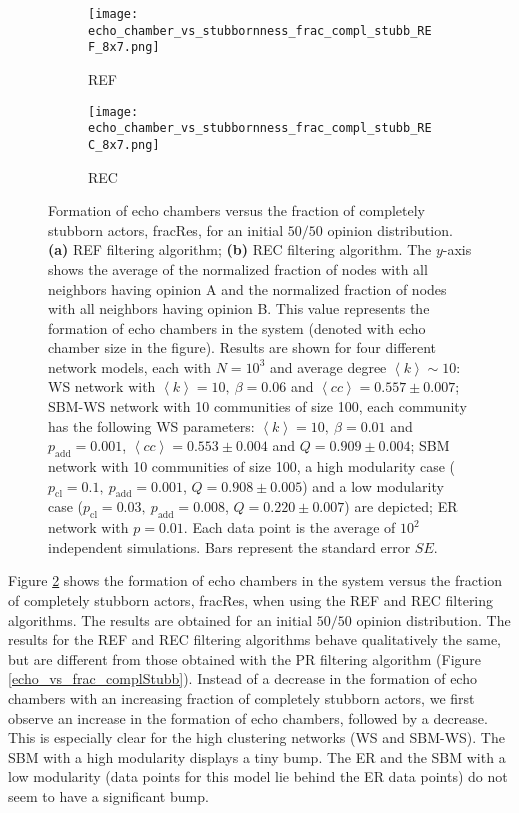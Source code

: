 \documentclass[11 pt , letterpaper , twoside , openright]{book}
\begin{document}
\begin{figure}[H]
  \begin{subfigure}[t]{0.49\textwidth}
    \caption{REF}
  	\texttt{[image: echo\_chamber\_vs\_stubbornness\_frac\_compl\_stubb\_REF\_8x7.png]}
  \end{subfigure}
  \begin{subfigure}[t]{0.49\textwidth}
    \caption{REC}
  	\texttt{[image: echo\_chamber\_vs\_stubbornness\_frac\_compl\_stubb\_REC\_8x7.png]}
    \label{REC_frac_compl_stubb}
  \end{subfigure}
  \captionsetup{format=plain}
  \caption[Formation of echo chambers versus fraction of completely stubborn actors for the REF and REC filtering algorithms and an initial $50/50$ opinion distribution.]{Formation of echo chambers versus the fraction of completely stubborn actors, fracRes, for an initial $50/50$ opinion distribution. \textbf{(a)} REF filtering algorithm; \textbf{(b)} REC filtering algorithm. The $y$-axis shows the average of the normalized fraction of nodes with all neighbors having opinion A and the normalized fraction of nodes with all neighbors having opinion B. This value represents the formation of echo chambers in the system (denoted with echo chamber size in the figure). Results are shown for four different network models, each with $N=10^3$ and average degree $\left<k\right> \sim 10$: WS network with $\left<k\right> =10,\ \beta = 0.06$ and $\left<cc \right> = 0.557 \pm 0.007$; SBM-WS network with 10 communities of size 100, each community has the following WS parameters: $\left<k\right> = 10,\ \beta = 0.01$ and $p_{\text{add}} = 0.001$, $\left<cc\right> = 0.553 \pm 0.004$ and $Q = 0.909 \pm 0.004$; SBM network with 10 communities of size 100, a high modularity case ($p_{\text{cl}} = 0.1,\ p_{\text{add}} = 0.001$, $Q = 0.908 \pm 0.005$) and a low modularity case ($p_{\text{cl}} = 0.03,\ p_{\text{add}} = 0.008$, $Q = 0.220 \pm 0.007$) are depicted; ER network with $p= 0.01$. Each data point is the average of $10^2$ independent simulations. Bars represent the standard error $SE$.}
\label{echo_vs_frac_complStubb_REF-REC}
\end{figure}
\noindent
Figure \ref{echo_vs_frac_complStubb_REF-REC} shows the formation of echo chambers in the system versus the fraction of completely stubborn actors, fracRes, when using the REF and REC filtering algorithms. The results are obtained for an initial $50/50$ opinion distribution. The results for the REF and REC filtering algorithms behave qualitatively the same, but are different from those obtained with the PR filtering algorithm (Figure \ref{echo_vs_frac_complStubb}). Instead of a decrease in the formation of echo chambers with an increasing fraction of completely stubborn actors, we first observe an increase in the formation of echo chambers, followed by a decrease. This is especially clear for the high clustering networks (WS and SBM-WS). The SBM with a high modularity displays a tiny bump. The ER and the SBM with a low modularity (data points for this model lie behind the ER data points) do not seem to have a significant bump.\\
\end{document}
